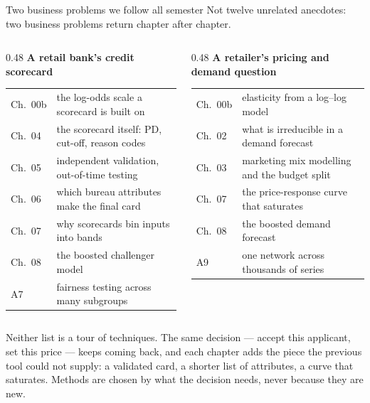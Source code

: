 \documentclass[aspectratio=169,11pt]{beamer}
\begin{document}
\begin{frame}{Two business problems we follow all semester}
  \scriptsize
  Not twelve unrelated anecdotes: two business problems return chapter after chapter.
  \vspace{0.6ex}

  \begin{columns}[t]
  \begin{column}{0.48\textwidth}
    \textbf{A retail bank's credit scorecard}\\[0.4ex]
    \begin{tabular}{@{}p{1.0cm}p{5.9cm}@{}}
      \toprule
      Ch.~00b & the log-odds scale a scorecard is built on \\
      Ch.~04  & the scorecard itself: PD, cut-off, reason codes \\
      Ch.~05  & independent validation, out-of-time testing \\
      Ch.~06  & which bureau attributes make the final card \\
      Ch.~07  & why scorecards bin inputs into bands \\
      Ch.~08  & the boosted challenger model \\
      A7      & fairness testing across many subgroups \\
      \bottomrule
    \end{tabular}
  \end{column}
  \begin{column}{0.48\textwidth}
    \textbf{A retailer's pricing and demand question}\\[0.4ex]
    \begin{tabular}{@{}p{1.0cm}p{5.9cm}@{}}
      \toprule
      Ch.~00b & elasticity from a log--log model \\
      Ch.~02  & what is irreducible in a demand forecast \\
      Ch.~03  & marketing mix modelling and the budget split \\
      Ch.~07  & the price-response curve that saturates \\
      Ch.~08  & the boosted demand forecast \\
      A9      & one network across thousands of series \\
      \bottomrule
    \end{tabular}
  \end{column}
  \end{columns}
  \vspace{0.8ex}

  \begin{takeaway}
    Neither list is a tour of techniques. The same decision --- accept this applicant, set this
    price --- keeps coming back, and each chapter adds the piece the previous tool could not
    supply: a validated card, a shorter list of attributes, a curve that saturates. Methods are
    chosen by what the decision needs, never because they are new.
  \end{takeaway}
\end{frame}
\end{document}
